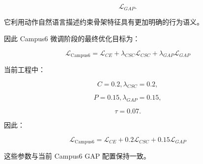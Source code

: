 \[
\mathcal L_{GAP}.
\]

它利用动作自然语言描述约束骨架特征具有更加明确的行为语义。

因此 Campus6 微调阶段的最终优化目标为：

\[
\boxed{
\mathcal L_{\text{Campus6}}
=
\mathcal L_{CE}
+
\lambda_{CSC}
\mathcal L_{CSC}
+
\lambda_{GAP}
\mathcal L_{GAP}
}
\]

当前工程中：

\[
C=0.2,\lambda_{CSC}=0.2,
\]

\[
P=0.15,\lambda_{GAP}=0.15,
\]

\[
\tau=0.07.
\]

因此：

\[
\boxed{
\mathcal L_{\text{Campus6}}
=
\mathcal L_{CE}
+
0.2\mathcal L_{CSC}
+
0.15\mathcal L_{GAP}
}
\]

这些参数与当前 Campus6 GAP 配置保持一致。

